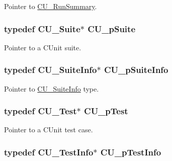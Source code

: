 Pointer to \hyperlink{structCU__RunSummary}{C\-U\-\_\-\-Run\-Summary}. 

\hypertarget{group__Framework_gaba832ae8b235f5e70d6a4ac9c3bb1219}{
\subsubsection[{C\-U\-\_\-p\-Suite}]{\setlength{\rightskip}{0pt plus 5cm}typedef {\bf C\-U\-\_\-\-Suite}$\ast$ {\bf C\-U\-\_\-p\-Suite}}}\label{group__Framework_gaba832ae8b235f5e70d6a4ac9c3bb1219}


Pointer to a C\-Unit suite. 

\hypertarget{group__Framework_gaf0deaec93829917ef410128e19ab8887}{
\subsubsection[{C\-U\-\_\-p\-Suite\-Info}]{\setlength{\rightskip}{0pt plus 5cm}typedef {\bf C\-U\-\_\-\-Suite\-Info}$\ast$ {\bf C\-U\-\_\-p\-Suite\-Info}}}\label{group__Framework_gaf0deaec93829917ef410128e19ab8887}


Pointer to \hyperlink{structCU__SuiteInfo}{C\-U\-\_\-\-Suite\-Info} type. 

\hypertarget{group__Framework_ga249c43fbe4e53452b3f90db1437da04b}{
\subsubsection[{C\-U\-\_\-p\-Test}]{\setlength{\rightskip}{0pt plus 5cm}typedef {\bf C\-U\-\_\-\-Test}$\ast$ {\bf C\-U\-\_\-p\-Test}}}\label{group__Framework_ga249c43fbe4e53452b3f90db1437da04b}


Pointer to a C\-Unit test case. 

\hypertarget{group__Framework_ga146a57ac2abef6382399be83afb1daed}{
\subsubsection[{C\-U\-\_\-p\-Test\-Info}]{\setlength{\rightskip}{0pt plus 5cm}typedef {\bf C\-U\-\_\-\-Test\-Info}$\ast$ {\bf C\-U\-\_\-p\-Test\-Info}}}\label{group__Framework_ga146a57ac2abef6382399be83afb1daed}


